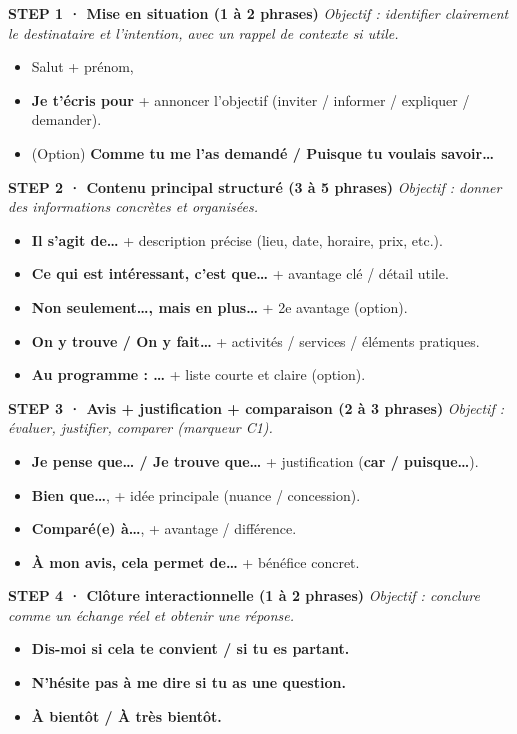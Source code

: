 \documentclass[12pt,a4paper]{article}
\begin{document}
\begin{tcolorbox}[title=\textbf{VERSION INFORMELLE · C1 (amis / proches)}]

\textbf{STEP 1 · Mise en situation (1 à 2 phrases)}
\emph{Objectif : identifier clairement le destinataire et l'intention, avec un rappel de contexte si utile.}
\begin{itemize}
  \item Salut + prénom,
  \item \textbf{Je t'écris pour} + annoncer l'objectif (inviter / informer / expliquer / demander).
  \item (Option) \textbf{Comme tu me l'as demandé / Puisque tu voulais savoir…}
\end{itemize}

\textbf{STEP 2 · Contenu principal structuré (3 à 5 phrases)}
\emph{Objectif : donner des informations concrètes et organisées.}
\begin{itemize}
  \item \textbf{Il s'agit de…} + description précise (lieu, date, horaire, prix, etc.).
  \item \textbf{Ce qui est intéressant, c'est que…} + avantage clé / détail utile.
  \item \textbf{Non seulement…, mais en plus…} + 2e avantage (option).
  \item \textbf{On y trouve / On y fait…} + activités / services / éléments pratiques.
  \item \textbf{Au programme : …} + liste courte et claire (option).
\end{itemize}

\textbf{STEP 3 · Avis + justification + comparaison (2 à 3 phrases)}
\emph{Objectif : évaluer, justifier, comparer (marqueur C1).}
\begin{itemize}
  \item \textbf{Je pense que… / Je trouve que…} + justification (\textbf{car / puisque…}).
  \item \textbf{Bien que…}, + idée principale (nuance / concession).
  \item \textbf{Comparé(e) à…}, + avantage / différence.
  \item \textbf{À mon avis, cela permet de…} + bénéfice concret.
\end{itemize}

\textbf{STEP 4 · Clôture interactionnelle (1 à 2 phrases)}
\emph{Objectif : conclure comme un échange réel et obtenir une réponse.}
\begin{itemize}
  \item \textbf{Dis-moi si cela te convient / si tu es partant.}
  \item \textbf{N'hésite pas à me dire si tu as une question.}
  \item \textbf{À bientôt / À très bientôt.}
\end{itemize}

\end{tcolorbox}
\end{document}
